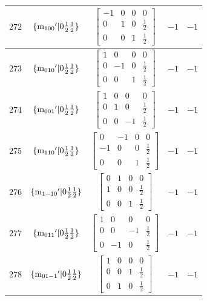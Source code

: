 \documentclass[fleqn,8pt]{jsarticle}
\begin{document}
\begin{longtable}{ccccc}
$ 272 $ & $ \{{\rm m}_{100}{}'|0 \frac{1}{2} \frac{1}{2}\} $ & $ \begin{bmatrix} -1 & 0 & 0 & 0 \\ 0 & 1 & 0 & \frac{1}{2} \\ 0 & 0 & 1 & \frac{1}{2} \end{bmatrix} $ & $ -1 $ & $ -1 $ \\ \hline
$ 273 $ & $ \{{\rm m}_{010}{}'|0 \frac{1}{2} \frac{1}{2}\} $ & $ \begin{bmatrix} 1 & 0 & 0 & 0 \\ 0 & -1 & 0 & \frac{1}{2} \\ 0 & 0 & 1 & \frac{1}{2} \end{bmatrix} $ & $ -1 $ & $ -1 $ \\ \hline
$ 274 $ & $ \{{\rm m}_{001}{}'|0 \frac{1}{2} \frac{1}{2}\} $ & $ \begin{bmatrix} 1 & 0 & 0 & 0 \\ 0 & 1 & 0 & \frac{1}{2} \\ 0 & 0 & -1 & \frac{1}{2} \end{bmatrix} $ & $ -1 $ & $ -1 $ \\ \hline
$ 275 $ & $ \{{\rm m}_{110}{}'|0 \frac{1}{2} \frac{1}{2}\} $ & $ \begin{bmatrix} 0 & -1 & 0 & 0 \\ -1 & 0 & 0 & \frac{1}{2} \\ 0 & 0 & 1 & \frac{1}{2} \end{bmatrix} $ & $ -1 $ & $ -1 $ \\ \hline
$ 276 $ & $ \{{\rm m}_{1-10}{}'|0 \frac{1}{2} \frac{1}{2}\} $ & $ \begin{bmatrix} 0 & 1 & 0 & 0 \\ 1 & 0 & 0 & \frac{1}{2} \\ 0 & 0 & 1 & \frac{1}{2} \end{bmatrix} $ & $ -1 $ & $ -1 $ \\ \hline
$ 277 $ & $ \{{\rm m}_{011}{}'|0 \frac{1}{2} \frac{1}{2}\} $ & $ \begin{bmatrix} 1 & 0 & 0 & 0 \\ 0 & 0 & -1 & \frac{1}{2} \\ 0 & -1 & 0 & \frac{1}{2} \end{bmatrix} $ & $ -1 $ & $ -1 $ \\ \hline
$ 278 $ & $ \{{\rm m}_{01-1}{}'|0 \frac{1}{2} \frac{1}{2}\} $ & $ \begin{bmatrix} 1 & 0 & 0 & 0 \\ 0 & 0 & 1 & \frac{1}{2} \\ 0 & 1 & 0 & \frac{1}{2} \end{bmatrix} $ & $ -1 $ & $ -1 $ \\ \hline

\end{longtable}
\end{document}
